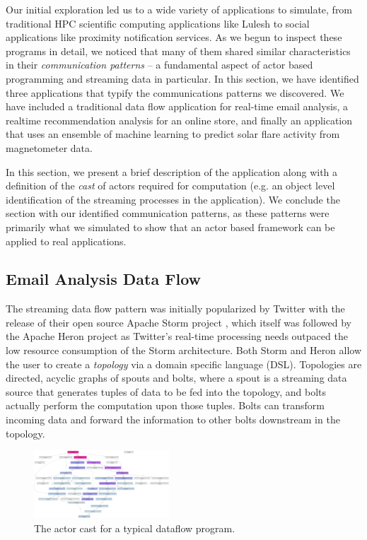 \documentclass[conference,twocolumn,11pt]{IEEEtran}
\begin{document}
Our initial exploration led us to a wide variety of applications to simulate, from traditional HPC scientific computing applications like Lulesh to social applications like proximity notification services. As we begun to inspect these programs in detail, we noticed that many of them shared similar characteristics in their \textit{communication patterns} -- a fundamental aspect of actor based programming and streaming data in particular. In this section, we have identified three applications that typify the communications patterns we discovered. We have included a traditional data flow application for real-time email analysis, a realtime recommendation analysis for an online store, and finally an application that uses an ensemble of machine learning to predict solar flare activity from magnetometer data.

In this section, we present a brief description of the application along with a definition of the \textit{cast} of actors required for computation (e.g. an object level identification of the streaming processes in the application). We conclude the section with our identified communication patterns, as these patterns were primarily what we simulated to show that an actor based framework can be applied to real applications.

\subsection{Email Analysis Data Flow}

The streaming data flow pattern was initially popularized by Twitter with the release of their open source Apache Storm project \cite{toshniwal_storm_2014}, which itself was followed by the Apache Heron project \cite{kulkarni_twitter_2015} as Twitter's real-time processing needs outpaced the low resource consumption of the Storm architecture. Both Storm and Heron allow the user to create a \textit{topology} via a domain specific language (DSL). Topologies are directed, acyclic graphs of spouts and bolts, where a spout is a streaming data source that generates tuples of data to be fed into the topology, and bolts actually perform the computation upon those tuples. Bolts can transform incoming data and forward the information to other bolts downstream in the topology.

\begin{figure}[!h]
    \centering
    \includegraphics[width=0.45\textwidth]{dataflow_cast}
    \caption{The actor cast for a typical dataflow program.}
    \label{fig:dataflow_cast}
\end{figure}
\end{document}
